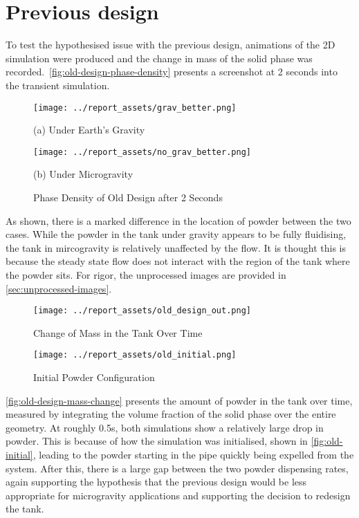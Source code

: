\section{Previous design}\label{sec:prev-design-analysis}
To test the hypothesised issue with the previous design, animations of the 2D simulation were produced and the change in mass of the solid phase was recorded.~\autoref{fig:old-design-phase-density} presents a screenshot at 2 seconds into the transient simulation. 
\begin{figure}[htbp]
    \centering
    
    \begin{minipage}{0.4\textwidth}
        \centering
        \texttt{[image: ../report\_assets/grav\_better.png]}
        \caption*{(a) Under Earth's Gravity}
    \end{minipage}
    \hfill
    \begin{minipage}{0.4\textwidth}
        \centering
        \texttt{[image: ../report\_assets/no\_grav\_better.png]}
        \caption*{(b) Under Microgravity}
    \end{minipage}
    \caption{Phase Density of Old Design after 2 Seconds}\label{fig:old-design-phase-density}
\end{figure}
As shown, there is a marked difference in the location of powder between the two cases. While the powder in the tank under gravity appears to be fully fluidising, the tank in mircogravity is relatively unaffected by the flow. It is thought this is because the steady state flow does not interact with the region of the tank where the powder sits. For rigor, the unprocessed images are provided in \autoref{sec:unprocessed-images}.

\begin{figure}[htbp]
    \centering
    
    \begin{minipage}{0.54\textwidth}
        \centering
        \texttt{[image: ../report\_assets/old\_design\_out.png]}
        \caption{Change of Mass in the Tank Over Time}\label{fig:old-design-mass-change}
    \end{minipage}
    \hfill
    \begin{minipage}{0.4\textwidth}
        \centering
        \texttt{[image: ../report\_assets/old\_initial.png]}
        \caption{Initial Powder Configuration}\label{fig:old-initial}
    \end{minipage}
\end{figure}
\autoref{fig:old-design-mass-change} presents the amount of powder in the tank over time, measured by integrating the volume fraction of the solid phase over the entire geometry. At roughly 0.5s, both simulations show a relatively large drop in powder. This is because of how the simulation was initialised, shown in \autoref{fig:old-initial}, leading to the powder starting in the pipe quickly being expelled from the system. After this, there is a large gap between the two powder dispensing rates, again supporting the hypothesis that the previous design would be less appropriate for microgravity applications and supporting the decision to redesign the tank. 

